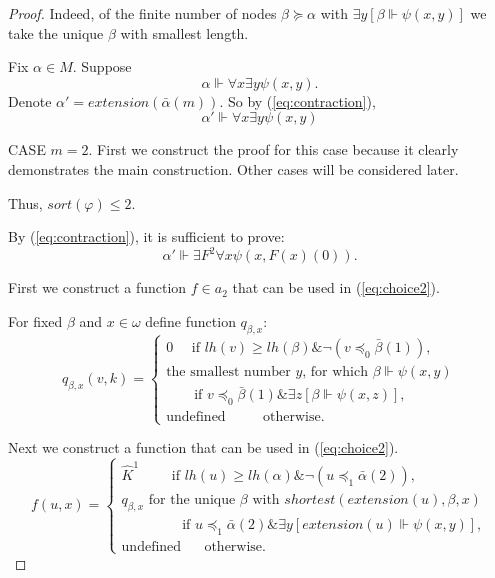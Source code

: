 \documentclass{asl}
\theoremstyle{definition}
\begin{document}
\begin{proof}
Indeed, of the finite number of nodes $\beta\succcurlyeq \alpha$ with $\exists y \left[\beta\Vdash \psi(x,y)\right]$ we take the unique $\beta$ with smallest length.

Fix $\alpha\in M$. Suppose 
\[ \alpha\Vdash\forall x\exists y\psi(x,y). \]
Denote $\alpha'=extension(\bar{\alpha}(m))$. So by (\ref{eq:contraction}),
\begin{equation}
 \alpha'\Vdash\forall x\exists y\psi(x,y) 
\label{eq:choice1}
\end{equation}

CASE $m=2$. First we construct the proof for this case because it clearly demonstrates the main construction. Other cases will be considered later. 

Thus, $ sort(\varphi)\leqslant 2 $. 

By (\ref{eq:contraction}), it is sufficient to prove: 
\begin{equation}
\alpha'\Vdash \exists F^2\forall x\psi(x,F(x)(0)).
\label{eq:choice2}
\end{equation}

First we construct a function $f\in a_2$ that can be used in (\ref{eq:choice2}). 

For fixed $\beta$ and $x\in \omega$ define function $q_{\beta, x}$: 
\begin{displaymath}
q_{\beta,x}(v,k)=
\begin{cases}
0 \quad \text{ if } lh(v)\geqslant lh(\beta) \& \neg(v\preccurlyeq_0\bar{\beta}(1)),\\
\text{the smallest number }y\text{, for which }\beta\Vdash \psi(x,y) \\
\qquad \text{if } v\preccurlyeq_0\bar{\beta}(1)\& \exists z\left[\beta\Vdash \psi(x,z)\right] ,\\
\text{undefined } \qquad \text{ otherwise.}
\end{cases}
\end{displaymath} 

Next we construct a function that can be used in (\ref{eq:choice2}).
\begin{displaymath}
f(u,x)=
\begin{cases}
\widehat{K}^1 \qquad \text{ if } lh(u)\geqslant lh(\alpha) \& \neg(u\preccurlyeq_1\bar{\alpha}(2)),\\
q_{\beta, x} \text{ for the unique } \beta \text{ with } shortest(extension(u),\beta,x) \\ 
\qquad \qquad \text{ if } u\preccurlyeq_1\bar{\alpha}(2) \& \exists y\left[extension(u)\Vdash \psi(x,y)\right] ,\\
\text{undefined } \quad \text{ otherwise.}
\end{cases}
\end{displaymath} 


\end{proof}
\end{document}
